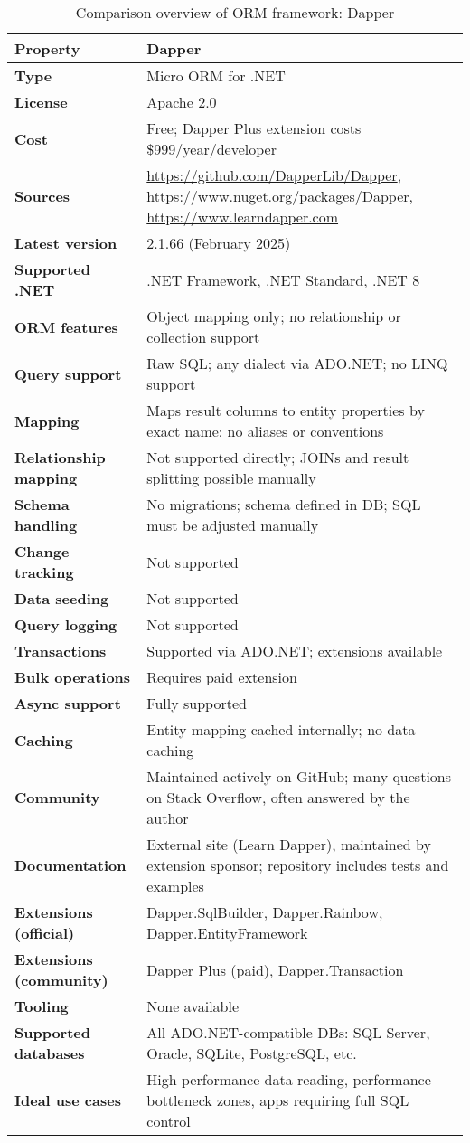 \begin{table}[H]
\centering
\caption{Comparison overview of ORM framework: Dapper}
\begin{tabular}{|l|l|}
\toprule
\textbf{Property} & \textbf{Dapper} \\
\midrule
\textbf{Type} & Micro ORM for .NET \\
\textbf{License} & Apache 2.0 \\
\textbf{Cost} & Free; Dapper Plus extension costs \$999/year/developer \\
\textbf{Sources} & \url{https://github.com/DapperLib/Dapper}, \url{https://www.nuget.org/packages/Dapper}, \url{https://www.learndapper.com} \\
\textbf{Latest version} & 2.1.66 (February 2025) \\
\textbf{Supported .NET} & .NET Framework, .NET Standard, .NET 8 \\
\textbf{ORM features} & Object mapping only; no relationship or collection support \\
\textbf{Query support} & Raw SQL; any dialect via ADO.NET; no LINQ support \\
\textbf{Mapping} & Maps result columns to entity properties by exact name; no aliases or conventions \\
\textbf{Relationship mapping} & Not supported directly; JOINs and result splitting possible manually \\
\textbf{Schema handling} & No migrations; schema defined in DB; SQL must be adjusted manually \\
\textbf{Change tracking} & Not supported \\
\textbf{Data seeding} & Not supported \\
\textbf{Query logging} & Not supported \\
\textbf{Transactions} & Supported via ADO.NET; extensions available \\
\textbf{Bulk operations} & Requires paid extension \\
\textbf{Async support} & Fully supported \\
\textbf{Caching} & Entity mapping cached internally; no data caching \\
\textbf{Community} & Maintained actively on GitHub; many questions on Stack Overflow, often answered by the author \\
\textbf{Documentation} & External site (Learn Dapper), maintained by extension sponsor; repository includes tests and examples \\
\textbf{Extensions (official)} & Dapper.SqlBuilder, Dapper.Rainbow, Dapper.EntityFramework \\
\textbf{Extensions (community)} & Dapper Plus (paid), Dapper.Transaction \\
\textbf{Tooling} & None available \\
\textbf{Supported databases} & All ADO.NET-compatible DBs: SQL Server, Oracle, SQLite, PostgreSQL, etc. \\
\textbf{Ideal use cases} & High-performance data reading, performance bottleneck zones, apps requiring full SQL control \\
\bottomrule
\end{tabular}
\end{table}

